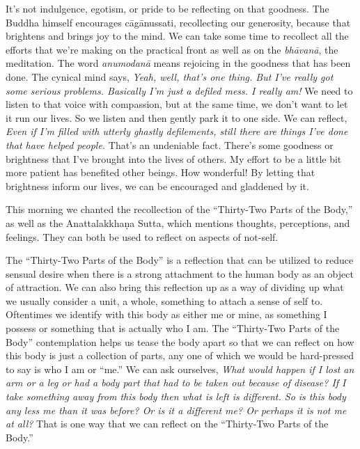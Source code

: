 It's not indulgence, egotism, or pride to be reflecting on that 
goodness. The Buddha himself encourages cāgānussati, recollecting our 
generosity, because that brightens and brings joy to the mind. We can 
take some time to recollect all the efforts that we're making on the 
practical front as well as on the \emph{bhāvanā}, the meditation. The 
word \emph{anumodanā} means rejoicing in the goodness that has been 
done. The cynical mind says, \emph{Yeah, well, that's one thing. But 
I've really got some serious problems. Basically I'm just a defiled 
mess. I really am!} We need to listen to that voice with compassion, 
but at the same time, we don't want to let it run our lives. So we 
listen and then gently park it to one side. We can reflect, \emph{Even 
if I'm filled with utterly ghastly defilements, still there are things 
I've done that have helped people.} That's an undeniable fact. There's 
some goodness or brightness that I've brought into the lives of others. 
My effort to be a little bit more patient has benefited other beings. 
How wonderful! By letting that brightness inform our lives, we can be 
encouraged and gladdened by it.


This morning we chanted the recollection of the ``Thirty-Two Parts of 
the Body,'' as well as the Anattalakkhaṇa Sutta, which mentions 
thoughts, perceptions, and feelings. They can both be used to reflect 
on aspects of not-self.

The ``Thirty-Two Parts of the Body'' is a reflection that can be 
utilized to reduce sensual desire when there is a strong attachment to 
the human body as an object of attraction. We can also bring this 
reflection up as a way of dividing up what we usually consider a unit, 
a whole, something to attach a sense of self to. Oftentimes we identify 
with this body as either me or mine, as something I possess or 
something that is actually who I am. The ``Thirty-Two Parts of the 
Body'' contemplation helps us tease the body apart so that we can 
reflect on how this body is just a collection of parts, any one of 
which we would be hard-pressed to say is who I am or ``me.'' We can ask 
ourselves, \emph{What would happen if I lost an arm or a leg or had a 
body part that had to be taken out because of disease? If I take 
something away from this body then what is left is different. So is 
this body any less me than it was before? Or is it a different me? Or 
perhaps it is not me at all?} That is one way that we can reflect on 
the ``Thirty-Two Parts of the Body.''

